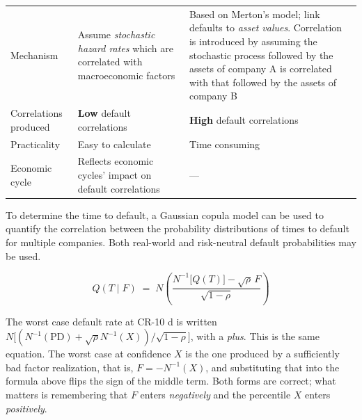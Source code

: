 \begin{center}
\footnotesize
\begin{tabular}{L{2.4cm} L{6.0cm} L{6.1cm}}
\toprule
 &  &  \\
\midrule
Mechanism & Assume \emph{stochastic hazard rates} which are correlated with
  macroeconomic factors &
  Based on Merton's model; link defaults to \emph{asset values}. Correlation is
  introduced by assuming the stochastic process followed by the assets of company
  A is correlated with that followed by the assets of company B \\
Correlations produced & \textbf{Low} default correlations &
  \textbf{High} default correlations \\
Practicality & Easy to calculate &
  Time consuming \\
Economic cycle & Reflects economic cycles' impact on default correlations & --- \\
\bottomrule
\end{tabular}
\end{center}


To determine the time to default, a Gaussian copula model can be used to quantify
the correlation between the probability distributions of times to default for
multiple companies. Both real-world and risk-neutral default probabilities may be
used.

\begin{crfmlbox}
\[ Q(T \mid F) \;=\; N\!\left(\frac{N^{-1}\bigl[Q(T)\bigr] - \sqrt{\rho}\,F}
   {\sqrt{1-\rho}}\right) \]
\end{crfmlbox}

\begin{crtrapbox}
The worst case default rate at CR-10 d is written
$N\bigl[(N^{-1}(\mathrm{PD}) + \sqrt{\rho}N^{-1}(X))/\sqrt{1-\rho}\bigr]$, with a
\emph{plus}. This is the same equation. The worst case at confidence $X$ is the
one produced by a sufficiently bad factor realization, that is,
$F = -N^{-1}(X)$, and substituting that into the formula above flips the sign of
the middle term. Both forms are correct; what matters is remembering that $F$
enters \emph{negatively} and the percentile $X$ enters \emph{positively}.
\end{crtrapbox}

